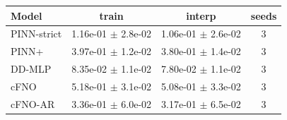 \begin{tabular}{lccc}
\toprule
Model & train & interp & seeds \\
\midrule
PINN-strict & 1.16e-01 $\pm$ 2.8e-02 & 1.06e-01 $\pm$ 2.6e-02 & 3 \\
PINN+ & 3.97e-01 $\pm$ 1.2e-02 & 3.80e-01 $\pm$ 1.4e-02 & 3 \\
DD-MLP & 8.35e-02 $\pm$ 1.1e-02 & 7.80e-02 $\pm$ 1.1e-02 & 3 \\
cFNO & 5.18e-01 $\pm$ 3.1e-02 & 5.08e-01 $\pm$ 3.3e-02 & 3 \\
cFNO-AR & 3.36e-01 $\pm$ 6.0e-02 & 3.17e-01 $\pm$ 6.5e-02 & 3 \\
\bottomrule
\end{tabular}
